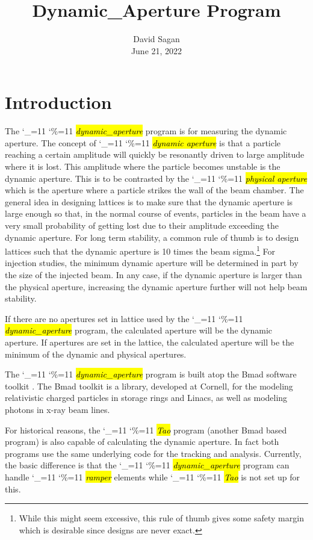 \documentclass{hitec}
\title{Dynamic_Aperture Program}
\author{}
\date{David Sagan \\ June 21, 2022}
\newcommand\dottcmd[1]{\hl{\em#1}\endgroup}
\newcommand{\vn}{\begingroup\catcode`\_=11 \catcode`\%=11 \dottcmd}
\newcommand{\da}{\vn{dynamic_aperture}\xspace}
\newcommand{\Section}[1]{\section{#1}\vspace*{-1ex}}
\begin{document}

\maketitle

\tableofcontents

\Section{Introduction} 
\label{s:intro}

The \da program is for measuring the dynamic aperture. The concept of \vn{dynamic aperture} is that
a particle reaching a certain amplitude will quickly be resonantly driven to large amplitude where
it is lost. This amplitude where the particle becomes unstable is the dynamic aperture. This is to
be contrasted by the \vn{physical aperture} which is the aperture where a particle strikes the wall
of the beam chamber. The general idea in designing lattices is to make sure that the dynamic
aperture is large enough so that, in the normal course of events, particles in the beam have a very
small probability of getting lost due to their amplitude exceeding the dynamic aperture. For long
term stability, a common rule of thumb is to design lattices such that the dynamic aperture is 10 times
the beam sigma.\footnote
  {
While this might seem excessive, this rule of thumb gives some safety margin which is desirable
since designs are never exact.
  }
For injection studies, the minimum dynamic aperture will be determined in part by the size of the
injected beam. In any case, if the dynamic aperture is larger than the physical aperture, increasing
the dynamic aperture further will not help beam stability. 

If there are no apertures set in lattice used by the \da program, the calculated aperture will be the
dynamic aperture. If apertures are set in the lattice, the calculated aperture will be the minimum of
the dynamic and physical apertures.

The \da program is built atop the Bmad software toolkit \cite{b:bmad}. The Bmad toolkit is a
library, developed at Cornell, for the modeling relativistic charged particles in storage rings and
Linacs, as well as modeling photons in x-ray beam lines.

For historical reasons, the \vn{Tao} program (another Bmad based program) is also capable of
calculating the dynamic aperture. In fact both programs use the same underlying code for the
tracking and analysis. Currently, the basic difference is that the \vn{dynamic_aperture} program can
handle \vn{ramper} elements while \vn{Tao} is not set up for this.
\end{document}
